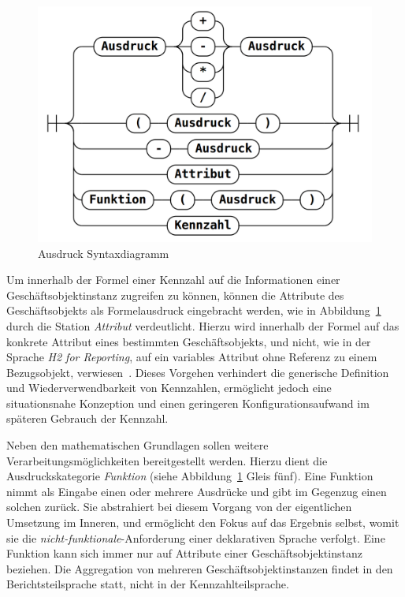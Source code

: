 \documentclass[
  language=german, %
  type=bachelor,%
  ngerman
]{isthesis}
\begin{document}
\begin{content}
  \begin{figure}
    \includegraphics[scale=0.25]{content/figures/railroad-kennzahl.png}
    \caption[Ausdruck Syntaxdiagramm]{Ausdruck Syntaxdiagramm \protect\footnotemark}\label{railroad-kennzahl}
  \end{figure}
	
  Um innerhalb der Formel einer Kennzahl auf die Informationen einer
  Geschäftsobjektinstanz zugreifen zu können, können die Attribute des
  Geschäftsobjekts als Formelausdruck eingebracht werden, wie in
  Abbildung~\ref{railroad-kennzahl} durch die Station \textit{Attribut}
  verdeutlicht. Hierzu wird innerhalb der Formel auf das konkrete Attribut
  eines bestimmten Geschäftsobjekts, und nicht, wie in der Sprache \textit{H2
  for Reporting}, auf ein variables Attribut ohne Referenz zu einem
  Bezugsobjekt, verwiesen~\cite[][S.  20]{becker2007h2}. Dieses Vorgehen
  verhindert die generische Definition und Wiederverwendbarkeit von Kennzahlen,
  ermöglicht jedoch eine situationsnahe Konzeption und einen geringeren
  Konfigurationsaufwand im späteren Gebrauch der Kennzahl.

	Neben den mathematischen Grundlagen sollen weitere Verarbeitungsmöglichkeiten
	bereitgestellt werden. Hierzu dient die Ausdruckskategorie \textit{Funktion}
	(siehe Abbildung~\ref{railroad-kennzahl} Gleis fünf). Eine Funktion nimmt als
	Eingabe einen oder mehrere Ausdrücke und gibt im Gegenzug einen solchen
	zurück. Sie abstrahiert bei diesem Vorgang von der eigentlichen Umsetzung im
	Inneren, und ermöglicht den Fokus auf das Ergebnis selbst, womit sie die
	\textit{nicht-funktionale}-Anforderung einer deklarativen Sprache verfolgt.
	Eine Funktion kann sich immer nur auf Attribute einer Geschäftsobjektinstanz
	beziehen. Die Aggregation von mehreren Geschäftsobjektinstanzen findet in den
	Berichtsteilsprache statt, nicht in der Kennzahlteilsprache.


\end{content}
\end{document}
